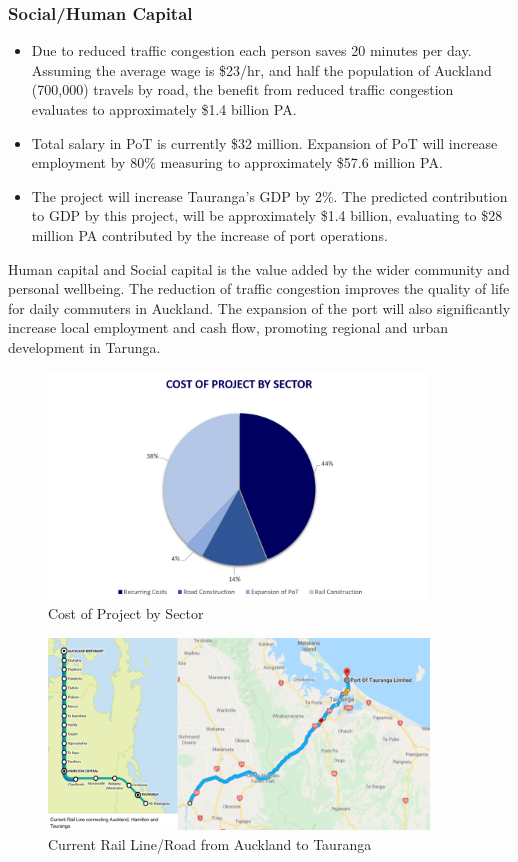     \subsubsection*{Social/Human Capital}
        \begin{itemize}[noitemsep]
            \item Due to reduced traffic congestion each person saves 20 minutes per day. Assuming the average wage is \$23/hr, and half the population of Auckland (700,000) travels by road, the benefit from reduced traffic congestion evaluates to approximately \$1.4 billion PA.
            \item Total salary in PoT is currently \$32 million. Expansion of PoT will increase employment by 80\% measuring to approximately \$57.6 million PA. 
            \item The project will increase Tauranga's GDP by 2\%. The predicted contribution to GDP by this project, will be approximately \$1.4 billion, evaluating to \$28 million PA contributed by the increase of port operations.
        \end{itemize}
        Human capital and Social capital is the value added by the wider community and personal wellbeing. The reduction of traffic congestion improves the quality of life for daily commuters in Auckland. The expansion of the port will also significantly increase local employment and cash flow, promoting regional and urban development in Tarunga.
        
\begin{figure}
\centering
\includegraphics[width=0.9\textwidth]{CostBySector.png}
\centering
\caption{Cost of Project by Sector}
\end{figure}

\begin{figure}
\centering
\includegraphics[width=0.9\textwidth]{implementationImage.png}
\centering
\caption{Current Rail Line/Road from Auckland to Tauranga}
\end{figure}

